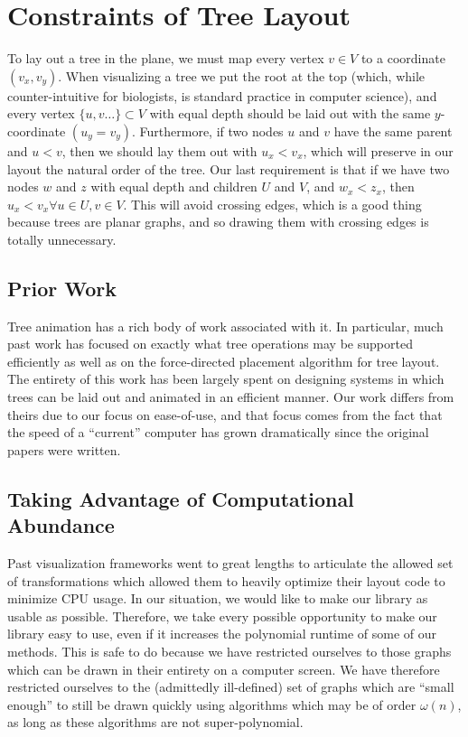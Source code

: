 \documentclass{article}
\begin{document}
\section{Constraints of Tree Layout}
\label{sec:constraints}
To lay out a tree in the plane, we must map every vertex $v \in V$ to a
coordinate $(v_x, v_y)$.  When visualizing a tree we put the root at the top
(which, while counter-intuitive for biologists, is standard practice in
computer science), and every vertex $\{u,v \ldots\} \subset V$ with equal depth
should be laid out with the same $y$-coordinate $(u_y = v_y)$.  Furthermore, if
two nodes $u$ and $v$ have the same parent and $u < v$, then we should lay them
out with $u_x < v_x$, which will preserve in our layout the natural order of the tree.  Our last requirement is that if we have two nodes $w$ and $z$ with equal depth and children $U$ and $V$, and $w_x < z_x$, then $u_x < v_x \forall u\in U, v\in V$.  This will avoid crossing edges, which is a good thing because trees are planar graphs, and so drawing them with crossing edges is totally unnecessary.

\subsection{Prior Work}

Tree animation has a rich body of work associated with it.  In particular, much
past work has focused on exactly what tree operations may be supported
efficiently\cite{Moen,tamassia} as well as on the force-directed placement
algorithm for tree layout\cite{fdp, Cohen}.  The entirety of this work has been
largely spent on designing systems in which trees can be laid out and animated
in an efficient manner.  Our work differs from theirs due to our focus on
ease-of-use, and that focus comes from the fact that the speed of a ``current''
computer has grown dramatically since the original papers were written.

\subsection{Taking Advantage of Computational Abundance}

Past visualization frameworks went to great lengths to articulate the allowed
set of transformations which allowed them to heavily optimize their layout code
to minimize CPU usage.  In our situation, we would like to make our library as
usable as possible.  Therefore, we take every possible opportunity to make our
library easy to use, even if it increases the polynomial runtime of some of our
methods.  This is safe to do because we have restricted ourselves to those
graphs which can be drawn in their entirety on a computer screen.  We have
therefore restricted ourselves to the (admittedly ill-defined) set of graphs
which are ``small enough'' to still be drawn quickly using algorithms which may
be of order $\omega(n)$, as long as these algorithms are not super-polynomial.
\end{document}
